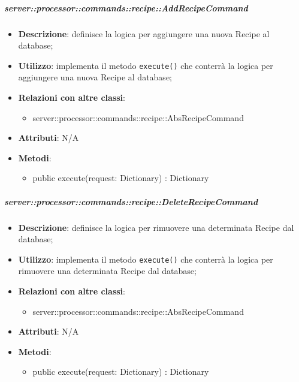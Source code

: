        \subparagraph{server::processor::commands::recipe::AddRecipeCommand} %
        \label{subp:bdsm_app_server_processor_commands_recipe_addrecipecommand}
        \begin{itemize}
          \item \textbf{Descrizione}: definisce la logica per aggiungere una nuova Recipe al database;
          \item \textbf{Utilizzo}: implementa il metodo \texttt{execute()} che conterrà la logica per aggiungere una nuova Recipe al database;
          \item \textbf{Relazioni con altre classi}:
            \begin{itemize}
              \item server::processor::commands::recipe::AbsRecipeCommand
            \end{itemize}
			\item \textbf{Attributi}: N/A
			\item \textbf{Metodi}:
        	\begin{itemize}
          		\item public execute(request: Dictionary) : Dictionary
        	\end{itemize}
        \end{itemize}

        \subparagraph{server::processor::commands::recipe::DeleteRecipeCommand} %
        \label{subp:bdsm_app_server_processor_commands_recipe_deleterecipecommand}
        \begin{itemize}
          \item \textbf{Descrizione}: definisce la logica per rimuovere una determinata Recipe dal database;
          \item \textbf{Utilizzo}: implementa il metodo \texttt{execute()} che conterrà la logica per rimuovere una determinata Recipe dal database;
          \item \textbf{Relazioni con altre classi}:
            \begin{itemize}
              \item server::processor::commands::recipe::AbsRecipeCommand
            \end{itemize}
			\item \textbf{Attributi}: N/A
			\item \textbf{Metodi}:
        	\begin{itemize}
          		\item public execute(request: Dictionary) : Dictionary
        	\end{itemize}
        \end{itemize}


